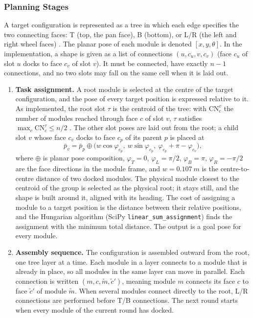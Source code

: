 \documentclass[12pt,a4paper]{article}
\begin{document}
\subsubsection{Planning Stages}

A target configuration is represented as a tree in which each edge specifies the two connecting faces: T (top, the pan face), B (bottom), or L/R (the left and right wheel faces) \cite{liu2017}. The planar pose of each module is denoted $[x, y, \theta]$. In the implementation, a shape is given as a list of connections $(u, c_u, v, c_v)$ (face $c_u$ of slot $u$ docks to face $c_v$ of slot $v$). It must be connected, have exactly $n-1$ connections, and no two slots may fall on the same cell when it is laid out.

\begin{enumerate}[topsep=2pt,itemsep=2pt,parsep=0pt,leftmargin=1.5em]
\item \textbf{Task assignment.} A root module is selected at the centre of the target configuration, and the pose of every target position is expressed relative to it. As implemented, the root slot $\tau$ is the centroid of the tree: with $\mathrm{CN}^v_c$ the number of modules reached through face $c$ of slot $v$, $\tau$ satisfies $\max_c \mathrm{CN}^{\tau}_c \le n/2$ \cite{liu2023}. The other slot poses are laid out from the root; a child slot $v$ whose face $c_v$ docks to face $c_p$ of its parent $p$ is placed at
\begin{equation}
  \bar{p}_v = \bar{p}_p \oplus
  \big(w\cos\varphi_{c_p},\ w\sin\varphi_{c_p},\ \varphi_{c_p} + \pi - \varphi_{c_v}\big),
\end{equation}
where $\oplus$ is planar pose composition, $\varphi_T = 0$, $\varphi_L = \pi/2$, $\varphi_B = \pi$, $\varphi_R = -\pi/2$ are the face directions in the module frame, and $w = \SI{0.107}{m}$ is the centre-to-centre distance of two docked modules. The physical module closest to the centroid of the group is selected as the physical root; it stays still, and the shape is built around it, aligned with its heading. The cost of assigning a module to a target position is the distance between their relative positions, and the Hungarian algorithm \cite{kuhn1955,munkres1957} (SciPy \texttt{linear\_sum\_assignment}) finds the assignment with the minimum total distance. The output is a goal pose for every module.
\item \textbf{Assembly sequence.} The configuration is assembled outward from the root, one tree layer at a time. Each module in a layer connects to a module that is already in place, so all modules in the same layer can move in parallel. Each connection is written $(m, c, \tilde{m}, \tilde{c}')$, meaning module $m$ connects its face $c$ to face $\tilde{c}'$ of module $\tilde{m}$. When several modules connect directly to the root, L/R connections are performed before T/B connections. The next round starts when every module of the current round has docked.

\end{enumerate}
\end{document}
